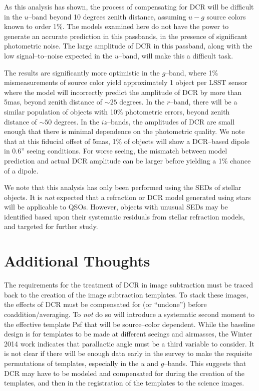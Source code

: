 \documentclass[DM,toc]{lsstdoc}
\begin{document}
As this analysis has shown, the process of compensating for DCR will
be difficult in the $u$--band beyond 10 degrees zenith distance,
assuming $u-g$ source colors known to order 1\%.  The models examined
here do not have the power to generate an accurate prediction in this
passbands, in the presence of significant photometric noise.  The
large amplitude of DCR in this passband, along with the low
signal--to--noise expected in the $u$--band, will make this a
difficult task.

The results are significantly more optimistic in the $g$--band, where
1\% mismeasurements of source color yield approximately 1 object per
LSST sensor where the model will incorrectly predict the amplitude of
DCR by more than 5mas, beyond zenith distance of $\sim 25$ degrees.
In the $r$--band, there will be a similar population of objects with
10\% photometric errors, beyond zenith distance of $\sim 50$ degrees.
In the $iz$--bands, the amplitudes of DCR are small enough that there
is minimal dependence on the photometric quality.  We note that at
this fiducial offset of 5mas, 1\% of objects will show a DCR--based
dipole in 0.6'' seeing conditions.  For worse seeing, the mismatch
between model prediction and actual DCR amplitude can be larger before
yielding a 1\% chance of a dipole.

We note that this analysis has only been performed using the SEDs of
stellar objects.  It is \textit{not} expected that a refraction or DCR
model generated using stars will be applicable to QSOs.  However,
objects with unusual SEDs may be identified based upon their
systematic residuals from stellar refraction models, and targeted for
further study.

\section{Additional Thoughts}

The requirements for the treatment of DCR in image subtraction must be
traced back to the creation of the image subtraction templates.  To
stack these images, the effects of DCR must be compensated for (or
``undone'') before coaddition/averaging.  To \textit{not} do so will
introduce a systematic second moment to the effective template Psf
that will be source--color dependent.  While the baseline design is
for templates to be made at different seeings and airmasses, the
Winter 2014 work indicates that parallactic angle must be a third
variable to consider.  It is not clear if there will be enough data
early in the survey to make the requisite permutations of templates,
especially in the $u$ and $g$--bands.  This suggests that DCR may have
to be modeled and compensated for during the creation of the
templates, and then in the registration of the templates to the
science images.
\end{document}
